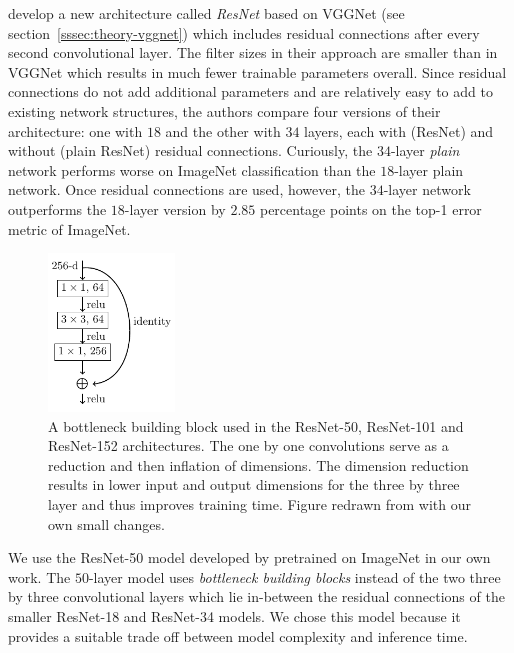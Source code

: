 \documentclass[draft,final]{vutinfth} %
\begin{document}
\textcite{he2016} develop a new architecture called \emph{ResNet}
based on VGGNet (see section~\ref{sssec:theory-vggnet}) which includes
residual connections after every second convolutional layer. The
filter sizes in their approach are smaller than in VGGNet which
results in much fewer trainable parameters overall. Since residual
connections do not add additional parameters and are relatively easy
to add to existing network structures, the authors compare four
versions of their architecture: one with $18$ and the other with $34$
layers, each with (ResNet) and without (plain ResNet) residual
connections. Curiously, the $34$-layer \emph{plain} network performs
worse on ImageNet classification than the $18$-layer plain
network. Once residual connections are used, however, the $34$-layer
network outperforms the $18$-layer version by $2.85$ percentage points
on the top-1 error metric of ImageNet.

\begin{figure}
  \centering
  \includegraphics[width=0.3\textwidth]{graphics/bottleneck/bottleneck.pdf}
  \caption[Bottleneck building block]{A bottleneck building block used
    in the ResNet-50, ResNet-101 and ResNet-152 architectures. The one
    by one convolutions serve as a reduction and then inflation of
    dimensions. The dimension reduction results in lower input and
    output dimensions for the three by three layer and thus improves
    training time. Figure redrawn from \textcite{he2016} with our own
    small changes.}
  \label{fig:residual-connection}
\end{figure}

We use the ResNet-50 model developed by \textcite{he2016} pretrained
on ImageNet in our own work. The $50$-layer model uses
\emph{bottleneck building blocks} instead of the two three by three
convolutional layers which lie in-between the residual connections of
the smaller ResNet-18 and ResNet-34 models. We chose this model
because it provides a suitable trade off between model complexity and
inference time.
\end{document}
